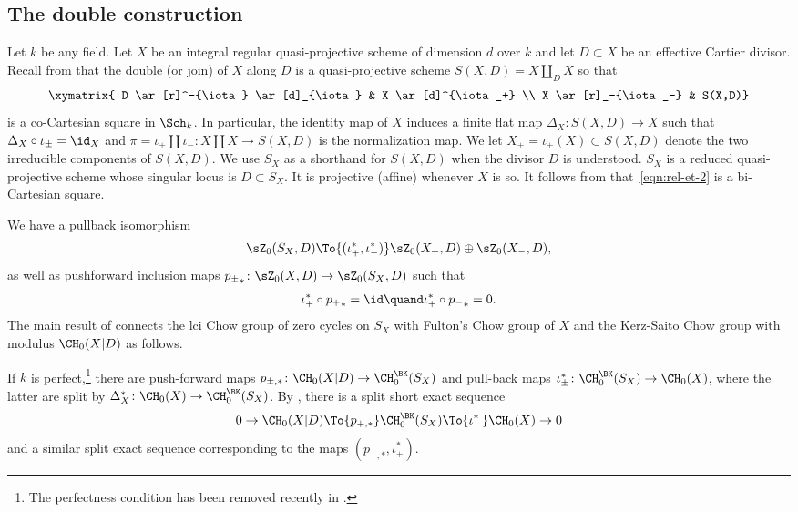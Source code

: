 \subsection{The double construction}\label{sec:double-construction}
Let $k$ be any field.
Let $X$ be an integral regular quasi-projective scheme of dimension $d$ over $k$
and let $D \subset X$ be an effective Cartier divisor. Recall from
\cite[\S2.1]{BK} that the double (or join) of $X$ along $D$ is a quasi-projective
scheme $S(X,D) = X \amalg_D X$ so that
\begin{equation}\label{eqn:rel-et-2}
\begin{array}{c}
\xymatrix{
D \ar[r]^-{\iota} \ar[d]_{\iota} & X \ar[d]^{\iota_+} \\
X \ar[r]_-{\iota_-} & S(X,D)}
\end{array}
\end{equation}
is a co-Cartesian square in $\Sch_k$.
In particular, the identity map of $X$ induces a finite flat map
$\Delta_X\colon S(X,D) \to X$ such that $\Delta_X \circ \iota_\pm = \id_X$
and $\pi = \iota_+ \amalg \iota_-: X \amalg X \to S(X,D)$
is the normalization map.
We let $X_\pm = \iota_\pm(X) \subset S(X,D)$ denote the two irreducible
components of $S(X,D)$. We use $S_X$ as a shorthand for $S(X, D)$
when the divisor $D$ is understood. $S_X$ is a reduced quasi-projective
scheme whose singular locus is $D \subset S_X$.
It is projective (\resp affine) whenever
$X$ is so. It follows from \cite[Lem.\,2.2]{Krishna-2} that~\eqref{eqn:rel-et-2}
is a bi-Cartesian square.

We have a pullback isomorphism
\[
\sZ_0(S_X,D)\To{(\iota^*_{+}, \iota^*_{-})} \sZ_0(X_+,D) \oplus
\sZ_0(X_-,D),
\]
as well as pushforward inclusion maps
${p_{\pm}}_* \colon \sZ_0(X,D) \to \sZ_0(S_X,D)$ such that
\[
\iota^*_{+} \circ {p_{+}}_* = \id
\quand\iota^*_{+} \circ {p_{-}}_* = 0.
\]
The main result of \cite{BK} connects the lci Chow group of zero cycles on $S_X$ with Fulton's Chow group of $X$ and the Kerz-Saito Chow group with modulus $\CH_0(X|D)$ as follows.

If $k$ is perfect,\footnote{The perfectness condition has been removed
recently in \cite[Th.\,1.1]{GKR}.} there are push-forward maps
$p_{\pm,*} \colon \CH_0(X|D) \to \CH_0^{\BK}(S_X)$ and pull-back maps
$\iota^*_\pm \colon \CH_0^{\BK}(S_X) \to \CH_0(X)$, where the latter
are split by $\Delta^*_X\colon \CH_0(X) \to \CH_0^{\BK}(S_X)$.
By \cite[Th.\,7.1]{BK}, there is a split short exact
sequence
\begin{equation}\label{eqn:doubl-ex-seq}
0 \to \CH_0(X|D) \To{p_{+,*}} \CH_0^{\BK}(S_X) \To{\iota^*_-}
\CH_0(X) \to 0
\end{equation}
and a similar split exact sequence corresponding to the maps $(p_{-,*}, \iota^*_+)$.

